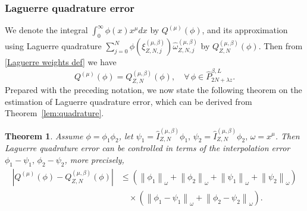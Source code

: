 \documentclass[pdflatex,sn-aps]{sn-jnl}%
\theoremstyle{thmstyleone}%
\newtheorem{theorem}{Theorem}[section]%
\theoremstyle{thmstyletwo}%
\theoremstyle{thmstylethree}%
\begin{document}
\subsubsection{Laguerre quadrature error}
We denote the integral $\int_0^{\infty} \phi(x) x^\mu d x$
by $Q^{(\mu)}(\phi)$, and its approximation using Laguerre quadrature
$\sum_{j=0}^N \phi\left(\xi_{Z, N, j}^{(\mu, \beta)}\right) \widehat{\omega}_{Z, N, j}^{(\mu, \beta)}$
by $Q_{Z, N}^{(\mu, \beta)}(\phi)$. Then from \eqref{Laguerre weights def}
we have
\begin{equation}\label{eq:0925-2}
  Q^{(\mu)}(\phi)=Q_{Z, N}^{(\mu, \beta)}(\phi), \quad \forall\, \phi \in \widehat{P}_{2 N+\lambda z}^{\beta, L}.
\end{equation}
Prepared with the preceding notation, we now state the following theorem on the estimation of Laguerre quadrature error,
which can be derived from Theorem~\ref{lem:quadrature}.

\begin{theorem}\label{thm:Laguerre quadrature error}
  Assume $\phi=\phi_1 \phi_2$, let $\psi_1=\widehat{I}_{Z, N}^{(\mu, \beta)} \phi_1, \,\psi_2=\widehat{I}_{Z, N}^{(\mu, \beta)} \phi_2, \,\omega=x^\mu$.
  Then Laguerre quadrature error can be controlled in terms of the interpolation error
  $\phi_1-\psi_1,\,\phi_2-\psi_2$, more precisely,
  \begin{equation}\label{eq:0925-3}
    \begin{aligned}
    \left|Q^{(\mu)}(\phi)-Q_{Z, N}^{(\mu, \beta)}(\phi)\right| & \leqslant\left(\left\|\phi_1\right\|_\omega+\left\|\phi_2\right\|_\omega+\left\|\psi_1\right\|_\omega+\left\|\psi_2\right\|_\omega\right) \\
    &\quad \times\left(\left\|\phi_1-\psi_1\right\|_\omega+\left\|\phi_2-\psi_2\right\|_\omega\right).
    \end{aligned}
  \end{equation}
\end{theorem}
\end{document}

